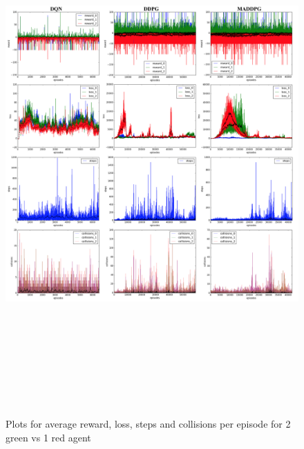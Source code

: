 \begin{figure}[htbp]
    \vspace*{-4cm}
    \hspace*{-3.5cm}
    \includegraphics[width=21cm, height=20cm]{1vs2}
	\caption{Plots for average reward, loss, steps and collisions per episode for 2 green vs 1 red agent}\label{Figure 3}
\end{figure}


